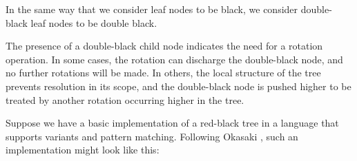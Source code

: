 \documentclass[preprint]{sigplanconf}
\begin{document}
In the same way that we consider leaf nodes to be black, we consider double-black leaf nodes to be double black.

The presence of a double-black child node indicates the need for a rotation operation. In some cases, the rotation can discharge the double-black node, and no further rotations will be made. In others, the local structure of the tree prevents resolution in its scope, and the double-black node is pushed higher to be treated by another rotation occurring higher in the tree.



Suppose we have a basic implementation of a red-black tree in a language that supports variants and pattern matching. Following Okasaki \cite{okasaki1999functional}, such an implementation might look like this:












\end{document}
